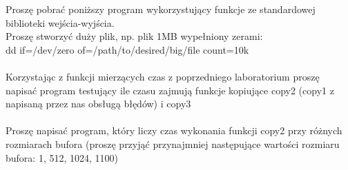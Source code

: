 \documentclass[a4paper,15pt]{article}
\newcommand{\assignment}[2]{
    \begin{tcolorbox}[colback=black!5!white,colframe=black,title={Zadanie #1}]
        #2
    \end{tcolorbox}
}
\begin{document}
\assignment{}{
Proszę pobrać poniższy program wykorzystujący funkcje ze standardowej biblioteki wejścia-wyjścia. \\
Proszę stworzyć duży plik, np. plik 1MB wypełniony zerami: \\
dd if=/dev/zero of=/path/to/desired/big/file count=10k \\ \\
Korzystając z funkcji mierzących czas z poprzedniego laboratorium proszę napisać program testujący ile czasu zajmują funkcje kopiujące copy2 (copy1 z napisaną przez nas obsługą błędów) i copy3 \\ \\
Proszę napisać program, który liczy czas wykonania funkcji copy2 przy różnych rozmiarach bufora (proszę przyjąć przynajmniej następujące wartości rozmiaru bufora: 1, 512, 1024, 1100)
}
\end{document}
